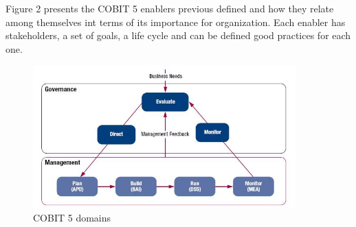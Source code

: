 Figure 2 presents the COBIT 5 enablers previous defined and how they relate among themselves int terms of its importance for organization. Each enabler has stakeholders, a set of goals, a life cycle and can be defined good practices for each one.\par

\begin{figure}
\centering
\includegraphics[width=0.9\textwidth]{img/COBITProcesses.jpg}
\caption{COBIT 5 domains}
\end{figure}

